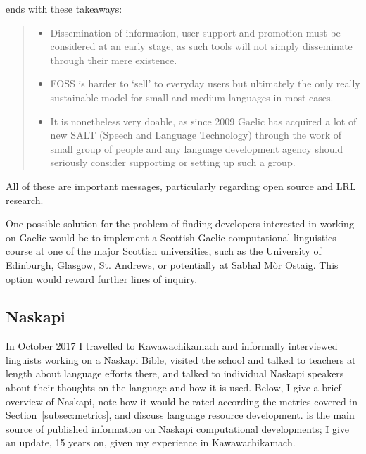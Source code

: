 \citet{bauer2014salt} ends with these takeaways:

\begin{quote}
\begin{itemize}
  \item Dissemination of information, user support and promotion must be considered at an early stage, as such tools will not simply disseminate through their mere existence.
  \item FOSS is harder to `sell' to everyday users but ultimately the only really sustainable model for small and medium languages in most cases.
  \item It is nonetheless very doable, as since 2009 Gaelic has acquired a lot of new SALT (Speech and Language Technology) through the work of small group of people and any language development agency should seriously consider supporting or setting up such a group.
\end{itemize}
\end{quote}

All of these are important messages, particularly regarding open source and LRL research.

One possible solution for the problem of finding developers interested in working on Gaelic would be to implement a Scottish Gaelic computational linguistics course at one of the major Scottish universities, such as the University of Edinburgh, Glasgow, St. Andrews, or potentially at Sabhal M\`or Ostaig. This option would reward further lines of inquiry.

\subsection{Naskapi}
\label{sec:naskapi}

In October 2017 I travelled to Kawawachikamach and informally interviewed linguists working on a Naskapi Bible, visited the school and talked to teachers at length about language efforts there, and talked to individual Naskapi speakers about their thoughts on the language and how it is used. Below, I give a brief overview of Naskapi, note how it would be rated according the metrics covered in Section~\ref{subsec:metrics}, and discuss language resource development. \citet{jancewicz2002applied} is the main source of published information on Naskapi computational developments; I give an update, 15 years on, given my experience in Kawawachikamach. %

